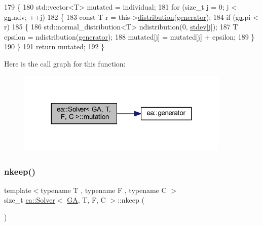 \begin{DoxyCode}
179     \{
180         std::vector<T> mutated = individual;
181         \textcolor{keywordflow}{for} (\textcolor{keywordtype}{size\_t} j = 0; j < \hyperlink{classea_1_1_solver_3_01_g_a_00_01_t_00_01_f_00_01_c_01_4_a5e56c4d15894af96c2be5fcaec7d14fb}{ga}.ndv; ++j)
182         \{
183             \textcolor{keyword}{const} T r = this->\hyperlink{classea_1_1_solver__base_ae88f44b13e264e092d3bbaeca6b3bd19}{distribution}(\hyperlink{namespaceea_a385e8ca8ba4ae2f69dcfffa79f20c2ff}{generator});
184             \textcolor{keywordflow}{if} (\hyperlink{classea_1_1_solver_3_01_g_a_00_01_t_00_01_f_00_01_c_01_4_a5e56c4d15894af96c2be5fcaec7d14fb}{ga}.pi < r)
185             \{
186                 std::normal\_distribution<T> ndistribution(0, \hyperlink{classea_1_1_solver_3_01_g_a_00_01_t_00_01_f_00_01_c_01_4_a097a7ec4bbcf9e5bade6e498d55d4d11}{stdev}[j]);
187                 T epsilon = ndistribution(\hyperlink{namespaceea_a385e8ca8ba4ae2f69dcfffa79f20c2ff}{generator});
188                 mutated[j] = mutated[j] + epsilon;
189             \}
190         \}
191         \textcolor{keywordflow}{return} mutated;
192     \}
\end{DoxyCode}
Here is the call graph for this function\+:
\nopagebreak
\begin{figure}[H]
\begin{center}
\leavevmode
\includegraphics[width=287pt]{classea_1_1_solver_3_01_g_a_00_01_t_00_01_f_00_01_c_01_4_adde7de03b3c72d6b491a566699b6a4e4_cgraph}
\end{center}
\end{figure}
\mbox{\label{classea_1_1_solver_3_01_g_a_00_01_t_00_01_f_00_01_c_01_4_a42fe3561ccfab0dd666410e243d977e5}} 
\subsubsection{\texorpdfstring{nkeep()}{nkeep()}}
{\footnotesize\ttfamily template$<$typename T , typename F , typename C $>$ \\
size\+\_\+t \hyperlink{classea_1_1_solver}{ea\+::\+Solver}$<$ \hyperlink{structea_1_1_g_a}{GA}, T, F, C $>$\+::nkeep (\begin{DoxyParamCaption}{ }\end{DoxyParamCaption})\hspace{0.3cm}{\ttfamily [private]}}



